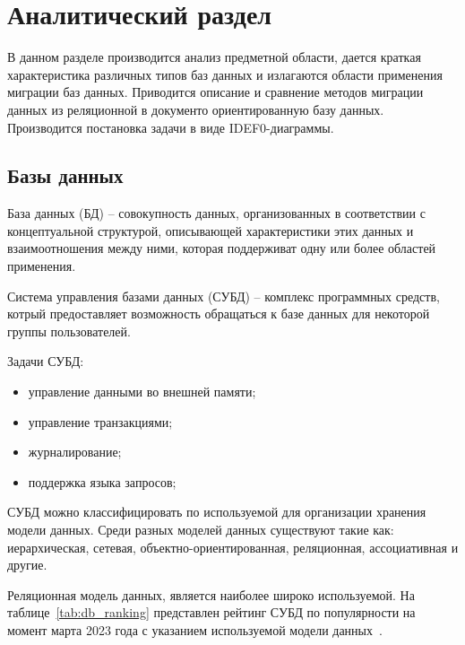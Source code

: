 \chapter{Аналитический раздел}

В данном разделе производится анализ предметной области, 
дается краткая характеристика различных типов баз данных и
излагаются области применения миграции баз данных. 
Приводится описание и сравнение методов миграции данных 
из реляционной в документо ориентированную базу данных. 
Производится постановка задачи в виде IDEF0-диаграммы.


\section{Базы данных}

База данных (БД) -- совокупность данных, организованных в соответствии
с концептуальной структурой, описывающей характеристики этих данных и
взаимоотношения между ними, которая поддерживат одну 
или более областей применения.

Система управления базами данных (СУБД) -- комплекс программных средств,
котрый предоставляет возможность обращаться к базе данных 
для некоторой группы пользователей.

Задачи СУБД:
\begin{itemize}[label=---]
    \item управление данными во внешней памяти;
    \item управление транзакциями;
    \item журналирование;
    \item поддержка языка запросов;
\end{itemize}

СУБД можно классифицировать по используемой для организации хранения модели данных.
Среди разных моделей данных существуют такие как:
иерархическая, сетевая, объектно-ориентированная, реляционная, ассоциативная и другие.

Реляционная модель данных, является наиболее широко используемой.
На таблице~\ref{tab:db_ranking} представлен рейтинг СУБД по популярности на момент
марта 2023 года с указанием используемой модели данных~\cite{db_rating}.

\clearpage

